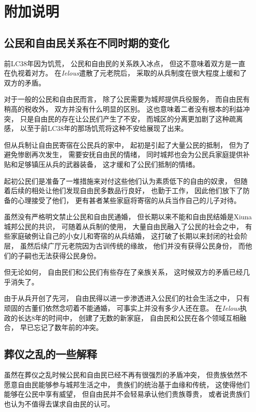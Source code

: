 \documentclass[12pt, a4paper]{ctexart}
\begin{document}
\section{附加说明}
    \subsection{公民和自由民关系在不同时期的变化}
        前LC38年因为饥荒，
        公民和自由民的关系跌入冰点，
        但这不意味着双方是一直在仇视着对方。
        在\emph{Ielous}遣散了元老院后，
        采取的从兵制度在很大程度上缓和了双方的矛盾。

        对于一般的公民和自由民而言，
        除了公民需要为城邦提供兵役服务，
        而自由民有稍高的税收外，
        双方并没有什么明显的区别。
        这也意味着二者没有根本的利益冲突，
        只是自由民的存在让公民们产生了不安，
        而城区的分离更加剧了这种疏离感，
        以至于前LC38年的那场饥荒将这种不安给展现了出来。

        但从兵制让自由民寄宿在公民兵的家中，
        起初是引起了大量公民的抵制，
        但为了避免惨剧再次发生，
        需要安抚自由民的情绪，
        同时城邦也会为公民兵家庭提供补贴和足够镇压从兵的武器装备，
        这才缓和了公民们抵制的情绪。

        起初公民们是准备了一堆措施来对付这些他们认为素质低下的自由的奴隶，
        但随着后续的相处让他们发现自由民多数品行良好，
        也勤于工作，
        因此他们放下了防备的心理接受了他们，
        更有甚者某些家庭将寄宿的从兵当作自己的儿子对待。

        虽然没有严格明文禁止公民和自由民通婚，
        但长期以来不能和自由民结婚是Xiuna城邦公民的共识，
        可随着从兵制的使用，
        大量自由民融入了公民的社会之中，
        有些家庭破例让自己的小女儿和寄宿的从兵结婚，
        这打破了长期以来封闭的社会阶层，
        虽然后续广厅元老院因为古训传统的缘故，
        他们并没有获得公民身份，
        而他们的子嗣也无法获得公民身份。

        但无论如何，
        自由民们和公民们有些存在了亲族关系，
        这时候双方的矛盾已经几乎消失了。

        由于从兵开创了先河，
        自由民得以进一步渗透进入公民们的社会生活之中，
        只有顽固的古董们依然念叨着不能通婚，
        可事实上并没有多少人还在意。
        在\emph{Ielous}执政的长达8年的时间中，
        创建了无数的新家庭，
        自由民和公民在各个领域互相融合，
        早已忘记了数年前的冲突。
    \subsection{葬仪之乱的一些解释}
        虽然在葬仪之乱时候公民和自由民已经不再有很强烈的矛盾冲突，
        但贵族依然不愿意自由民能够参与城邦生活之中，
        贵族们的统治基于血缘和传统，
        这使得他们能够在公民中享有威望，
        但自由民并不会轻易承认他们贵族尊贵，
        或者说贵族们也认为不值得去谋求自由民的认可。
\end{document}
